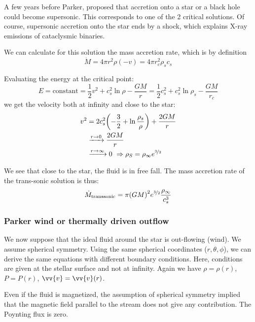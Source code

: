 \documentclass[10pt,a4paper,english]{article}
\let\originalleft\left
\let\originalright\right
\renewcommand{\left}{\mathopen{}\mathclose\bgroup\originalleft}
\renewcommand{\right}{\aftergroup\egroup\originalright}
\begin{document}
A few years before Parker, \cite{1952MNRAS.112..195B} proposed that accretion
onto a star or a black hole could become supersonic. This corresponds to one of
the 2 critical solutions. Of course, supersonic accretion onto the star ends by
a shock, which explains X-ray emissions of cataclysmic binaries.

We can calculate for this solution the mass accretion rate, which is by
definition
\begin{equation}
    \dot{M} = 4\pi r^2 \rho (-v) = 4\pi r_c^2 \rho_s c_s
\end{equation}

Evaluating the energy at the critical point:
\begin{equation}
    E = \textrm{constant} = \frac{1}{2}v^2 + c_s^2 \ln\rho - \frac{GM}{r} = \frac{1}{2}c_s^2 + c_s^2 \ln \rho_s - \frac{GM}{r_c}
\end{equation}
we get the velocity both at infinity and close to the star:
\begin{align}
    v^2 &= 2c_s^2 \left( -\frac{3}{2} + \ln \frac{\rho_s}{\rho} \right)  + \frac{2GM}{r} \\
        & \xrightarrow{r\to 0} \frac{2GM}{r} \\
        & \xrightarrow{r\to\infty} 0\ \Rightarrow \rho_S = \rho_\infty e^{\nicefrac{3}{2}}
\end{align}

We see that close to the star, the fluid is in free fall. The mass accretion
rate of the trans-sonic solution is thus:
\begin{equation}
    \dot{M}_\mathrm{transsonic} = \pi \left( GM \right)^2 e^{\nicefrac{3}{2}} \frac{\rho_\infty}{c_s^3}
\end{equation}

\subsubsection{Parker wind or thermally driven outflow}

We now suppose that the ideal fluid around the star is out-flowing (wind). We
assume spherical symmetry. Using the same spherical coordinates ($r, \theta,
\phi$), we can derive the same equations with different boundary conditions.
Here, conditions are given at the stellar surface and not at infinity. Again we
have $\rho = \rho(r)$, $P = P(r)$, $\vv{v} = \vv{v}(r)$.

Even if the fluid is magnetized, the assumption of spherical symmetry implied
that the magnetic field parallel to the stream does not give any contribution.
The Poynting flux is zero.
\end{document}
